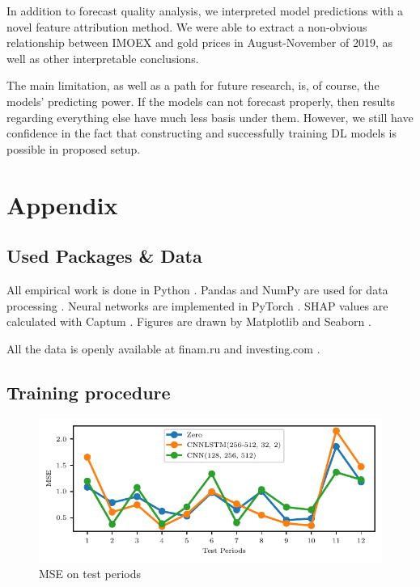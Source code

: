 \documentclass[review, authoryear]{elsarticle}
\begin{document}
In addition to forecast quality analysis, we interpreted model predictions with a novel feature attribution method. We were able to extract a non-obvious relationship between IMOEX and gold prices in August-November of 2019, as well as other interpretable conclusions.

The main limitation, as well as a path for future research, is, of course, the models' predicting power. If the models can not forecast properly, then results regarding everything else have much less basis under them. 
However, we still have confidence in the fact that constructing and successfully training DL models is possible in proposed setup.


\clearpage

\section{Appendix}

\subsection{Used Packages \& Data}

\noindent All empirical work is done in Python \citep{van_rossum_python_2009}. Pandas and NumPy are used for data processing \citep{mckinney_data_2010,harris_array_2020}.
Neural networks are implemented in PyTorch \citep{paszke_pytorch_2019}. SHAP values are calculated with Captum \citep{kokhlikyan_captum_2020}. Figures are drawn by Matplotlib and Seaborn \citep{hunter_matplotlib_2007,waskom_seaborn_2021}.

All the data is openly available at finam.ru and investing.com \citep{noauthor_investingcom_nodate, noauthor_finam_nodate}. 

\subsection{Training procedure}

\begin{figure}[h]
	\centering
	\includegraphics{periods.pdf}
	\caption{MSE on test periods}
	\label{fig:test_mse}
\end{figure}
\end{document}
